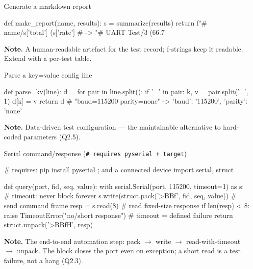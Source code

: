 \begin{gymproblem}{Generate a markdown report}
\begin{pygym}
def make_report(name, results):
    s = summarize(results)
    return f"# {name}\n{}/{s['total']} ({s['rate']}%
# -> "# UART Test\n{}/3 (66.7%
\end{pygym}
\textbf{Note.} A human-readable artefact for the test record; f-strings keep it
readable. Extend with a per-test table.
\end{gymproblem}

\begin{gymproblem}{Parse a key=value config line}
\begin{pygym}
def parse_kv(line):
    d = {}
    for pair in line.split():
        if '=' in pair:
            k, v = pair.split('=', 1)
            d[k] = v
    return d
# "baud=115200 parity=none" -> {'baud': '115200', 'parity': 'none'}
\end{pygym}
\textbf{Note.} Data-driven test configuration --- the maintainable alternative to
hard-coded parameters (Q2.5).
\end{gymproblem}

\begin{gymproblem}{Serial command/response (\texttt{\# requires pyserial + target})}
\begin{pygym}
# requires: pip install pyserial ; and a connected device
import serial, struct

def query(port, fid, seq, value):
    with serial.Serial(port, 115200, timeout=1) as s:   # timeout: never block forever
        s.write(struct.pack('>BBf', fid, seq, value))   # send command frame
        resp = s.read(8)                                # read fixed-size response
        if len(resp) < 8:
            raise TimeoutError("no/short response")     # timeout = defined failure
        return struct.unpack('>BBfH', resp)
\end{pygym}
\textbf{Note.} The end-to-end automation step: pack $\rightarrow$ write
$\rightarrow$ read-with-timeout $\rightarrow$ unpack. The  block closes
the port even on exception; a short read is a test failure, not a hang (Q2.3).
\end{gymproblem}

